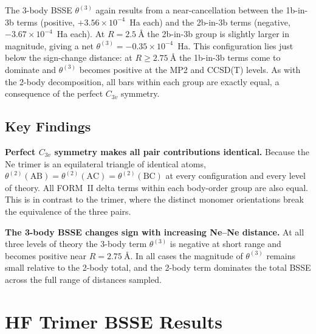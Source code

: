 \clearpage

The 3-body BSSE $\theta^{(3)}$ again results from a near-cancellation
between the 1b-in-3b terms (positive, $+3.56 \times 10^{-4}$~Ha each)
and the 2b-in-3b terms (negative, $-3.67 \times 10^{-4}$~Ha each).
At $R = \SI{2.5}{\angstrom}$ the 2b-in-3b group is slightly larger
in magnitude, giving a net $\theta^{(3)} = -0.35 \times 10^{-4}$~Ha.
This configuration lies just below the sign-change distance: at $R
\geq \SI{2.75}{\angstrom}$ the 1b-in-3b terms come to dominate and
$\theta^{(3)}$ becomes positive at the MP2 and CCSD(T) levels. As
with the 2-body decomposition, all bars within each group are exactly
equal, a consequence of the perfect $C_{3v}$ symmetry.

\subsection{Key Findings}

\begin{finding_box}
\textbf{Perfect $C_{3v}$ symmetry makes all pair contributions
identical.}
Because the Ne trimer is an equilateral triangle of identical atoms,
$\theta^{(2)}(\text{AB}) = \theta^{(2)}(\text{AC}) =
\theta^{(2)}(\text{BC})$ at every configuration and every level of
theory. All FORM~II delta terms within each body-order group are also
equal. This is in contrast to the  trimer, where the distinct
monomer orientations break the equivalence of the three pairs.
\end{finding_box}

\begin{finding_box}
\textbf{The 3-body BSSE changes sign with increasing Ne--Ne distance.}
At all three levels of theory the 3-body term $\theta^{(3)}$ is
negative at short range and becomes positive near $R =
\SI{2.75}{\angstrom}$. In all cases the magnitude of $\theta^{(3)}$
remains small relative to the 2-body total, and the 2-body term
dominates the total BSSE across the full range of distances sampled.
\end{finding_box}

\clearpage

\section{HF Trimer BSSE Results}

